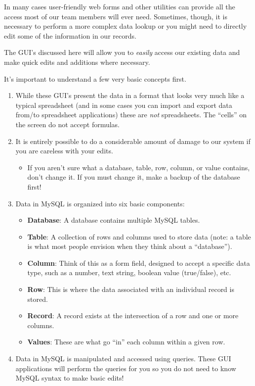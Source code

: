 \documentclass[pdflatex,letterpaper,twoside,12pt]{book}
\begin{document}
In many cases user-friendly web forms and other utilities can provide all the access most of our team members will ever need.  Sometimes, though, it is necessary to perform a more complex data lookup or you might need to directly edit some of the information in our records.

The GUI's discussed here will allow you to \emph{easily} access our existing data and make quick edits and additions where necessary.

It's important to understand a few very basic concepts first.

\begin{enumerate}
\item While these GUI's present the data in a format that looks very much like a typical spreadsheet (and in some cases you can import and export data from/to spreadsheet applications) these are \emph{not} spreadsheets.  The ``cells'' on the screen do not accept formulas.

\item It is entirely possible to do a considerable amount of damage to our system if you are careless with your edits.
	\begin{itemize}
	\item If you aren't sure what a database, table, row, column, or value contains, don't change it.  If you must change it, make a backup of the database first!
	\end{itemize}
	
\item Data in MySQL is organized into six basic components:
   \begin{itemize}
	\item \textbf{Database}:  A database contains multiple MySQL tables.
	\item \textbf{Table}:  A collection of rows and columns used to store data (note: a table is what most people envision when they think about a ``database'').
	\item \textbf{Column}:  Think of this as a form field, designed to accept a specific data type, such as a number, text string, boolean value (true/false), etc.
	\item \textbf{Row}:  This is where the data associated with an individual record is stored.
	\item \textbf{Record}:  A record exists at the intersection of a row and one or more columns.
	\item \textbf{Values}:  These are what go ``in'' each column within a given row.
   \end{itemize}
   
\item Data in MySQL is manipulated and accessed using queries.  These GUI applications will perform the queries for you so you do not need to know MySQL syntax to make basic edits!
\end{enumerate}
\end{document}
